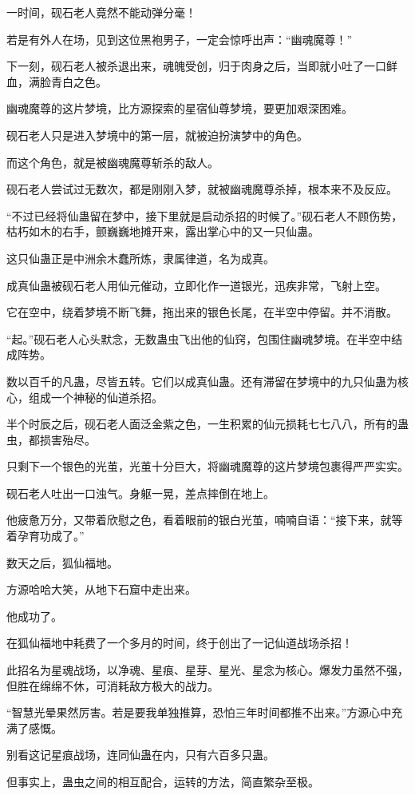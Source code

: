 \begin{this_body}
一时间，砚石老人竟然不能动弹分毫！

若是有外人在场，见到这位黑袍男子，一定会惊呼出声：“幽魂魔尊！”

下一刻，砚石老人被杀退出来，魂魄受创，归于肉身之后，当即就小吐了一口鲜血，满脸青白之色。

幽魂魔尊的这片梦境，比方源探索的星宿仙尊梦境，要更加艰深困难。

砚石老人只是进入梦境中的第一层，就被迫扮演梦中的角色。

而这个角色，就是被幽魂魔尊斩杀的敌人。

砚石老人尝试过无数次，都是刚刚入梦，就被幽魂魔尊杀掉，根本来不及反应。

“不过已经将仙蛊留在梦中，接下里就是启动杀招的时候了。”砚石老人不顾伤势，枯朽如木的右手，颤巍巍地摊开来，露出掌心中的又一只仙蛊。

这只仙蛊正是中洲余木蠢所炼，隶属律道，名为成真。

成真仙蛊被砚石老人用仙元催动，立即化作一道银光，迅疾非常，飞射上空。

它在空中，绕着梦境不断飞舞，拖出来的银色长尾，在半空中停留。并不消散。

“起。”砚石老人心头默念，无数蛊虫飞出他的仙窍，包围住幽魂梦境。在半空中结成阵势。

数以百千的凡蛊，尽皆五转。它们以成真仙蛊。还有滞留在梦境中的九只仙蛊为核心，组成一个神秘的仙道杀招。

半个时辰之后，砚石老人面泛金紫之色，一生积累的仙元损耗七七八八，所有的蛊虫，都损害殆尽。

只剩下一个银色的光茧，光茧十分巨大，将幽魂魔尊的这片梦境包裹得严严实实。

砚石老人吐出一口浊气。身躯一晃，差点摔倒在地上。

他疲惫万分，又带着欣慰之色，看着眼前的银白光茧，喃喃自语：“接下来，就等着孕育功成了。”

数天之后，狐仙福地。

方源哈哈大笑，从地下石窟中走出来。

他成功了。

在狐仙福地中耗费了一个多月的时间，终于创出了一记仙道战场杀招！

此招名为星魂战场，以净魂、星痕、星芽、星光、星念为核心。爆发力虽然不强，但胜在绵绵不休，可消耗敌方极大的战力。

“智慧光晕果然厉害。若是要我单独推算，恐怕三年时间都推不出来。”方源心中充满了感慨。

别看这记星痕战场，连同仙蛊在内，只有六百多只蛊。

但事实上，蛊虫之间的相互配合，运转的方法，简直繁杂至极。


\end{this_body}
